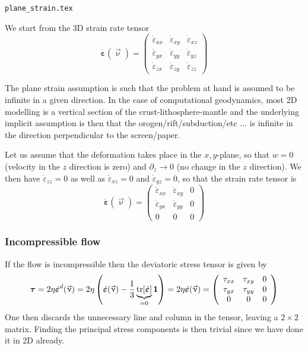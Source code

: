 \begin{flushright} {\tiny {\color{gray} \tt plane\_strain.tex}} \end{flushright}

We start from the 3D strain rate tensor 
\[
\dot{\bm \varepsilon}(\vec\upnu) = 
\left(
\begin{array}{ccc}
\dot{\varepsilon}_{xx} & \dot{\varepsilon}_{xy} & \dot{\varepsilon}_{xz} \\
\dot{\varepsilon}_{yx} & \dot{\varepsilon}_{yy} & \dot{\varepsilon}_{yz} \\
\dot{\varepsilon}_{zx} & \dot{\varepsilon}_{zy} & \dot{\varepsilon}_{zz} 
\end{array}
\right)
\]

The plane strain assumption is such that the problem at hand is assumed to be 
infinite in a given direction. In the case of computational geodynamics, most 2D 
modelling is a vertical section of the crust-lithosphere-mantle
and the underlying implicit assumption is then that the orogen/rift/subduction/etc ... 
is infinite in the direction perpendicular to the screen/paper.  

Let us assume that the deformation takes place in the $x,y$-plane,
so that $w=0$ (velocity in the $z$ direction is zero) and $\partial_z \rightarrow 0$ 
(no change in the $z$ direction).
We then have $\dot{\varepsilon}_{zz}=0$ as well as $\dot{\varepsilon}_{xz}=0$ 
and $\dot{\varepsilon}_{yz}=0$, so that the strain rate tensor is 
\[
\dot{\bm \varepsilon}(\vec\upnu)=
\left( \begin{array}{ccc}
\dot{\varepsilon}_{xx} & \dot{\varepsilon}_{xy} & 0 \\
\dot{\varepsilon}_{yx} & \dot{\varepsilon}_{yy} & 0 \\
0 & 0 & 0
\end{array}\right)
\]

\subsubsection{Incompressible flow}

If the flow is incompressible then the deviatoric stress tensor is given by
\[
\bm\tau 
= 2 \eta \dot{\bm \varepsilon}^d(\vec\upnu)
= 2 \eta \left(\dot{\bm \varepsilon}(\vec\upnu) 
-\frac13 \underbrace{{\rm tr}[\dot{\bm \varepsilon}]}_{=0} 
{\bm 1}\right)
= 2 \eta \dot{\bm \varepsilon}(\vec\upnu) 
=
\left(\begin{array}{ccc}
\tau_{xx} & \tau_{xy} & 0 \\
\tau_{yx} & \tau_{yy} & 0 \\
0 & 0 & 0
\end{array}\right)
\]
One then discards the unnecessary line and column in the tensor, leaving a $2\times 2$ matrix.
Finding the principal stress components is then trivial since we have done it in 2D already.

